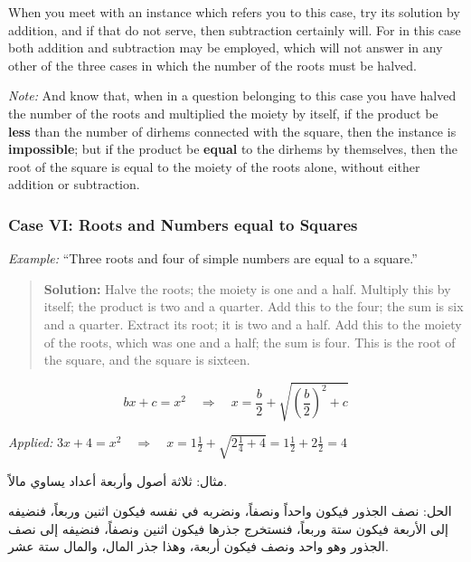 \documentclass[11pt,a4paper]{book}
\newcommand{\cnote}[1]{\textcolor{notecolor}{\textit{#1}}}
\begin{document}
When you meet with an instance which refers you to this case, try its
solution by addition, and if that do not serve, then subtraction certainly
will. For in this case both addition and subtraction may be employed, which
will not answer in any other of the three cases in which the number of the
roots must be halved.

\cnote{Note:} And know that, when in a question belonging to this case you
have halved the number of the roots and multiplied the moiety by itself, if
the product be \textbf{less} than the number of dirhems connected with the
square, then the instance is \textbf{impossible}; but if the product be
\textbf{equal} to the dirhems by themselves, then the root of the square is
equal to the moiety of the roots alone, without either addition or
subtraction.

\subsubsection*{Case VI: Roots and Numbers equal to Squares}

\textit{Example:} ``Three roots and four of simple numbers are equal to a
square.''

\begin{quote}
\textbf{Solution:} Halve the roots; the moiety is one and a half. Multiply
this by itself; the product is two and a quarter. Add this to the four; the
sum is six and a quarter. Extract its root; it is two and a half. Add this
to the moiety of the roots, which was one and a half; the sum is four. This
is the root of the square, and the square is sixteen.
\end{quote}

\begin{mathbox}[title={\textbf{The Algorithm for Case VI}}]
\begin{equation}
bx + c = x^2 \quad\Longrightarrow\quad x = \frac{b}{2} + \sqrt{\left(\frac{b}{2}\right)^2 + c}
\end{equation}

\textit{Applied:} $3x + 4 = x^2 \quad\Rightarrow\quad x = 1\tfrac{1}{2} + \sqrt{2\tfrac{1}{4} + 4} = 1\tfrac{1}{2} + 2\tfrac{1}{2} = 4$
\end{mathbox}

\begin{arabicbox}
\begin{Arabic}
مثال: ثلاثة أصول وأربعة أعداد يساوي مالاً.

الحل: نصف الجذور فيكون واحداً ونصفاً، ونضربه في نفسه فيكون
اثنين وربعاً، فنضيفه إلى الأربعة فيكون ستة وربعاً، فنستخرج
جذرها فيكون اثنين ونصفاً، فنضيفه إلى نصف الجذور وهو واحد
ونصف فيكون أربعة، وهذا جذر المال، والمال ستة عشر.
\end{Arabic}
\end{arabicbox}
\end{document}
